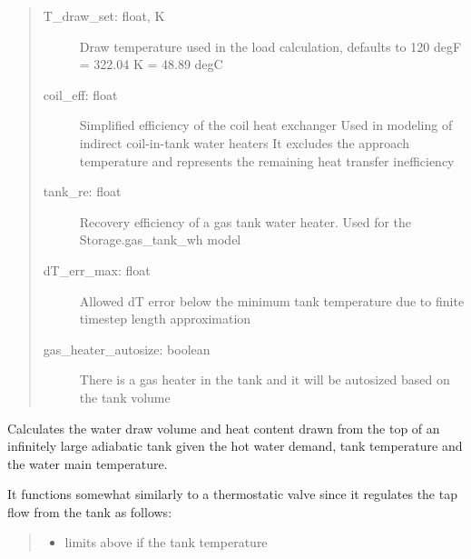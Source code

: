 \documentclass[letterpaper,10pt,english,openany]{sphinxmanual}
\begin{document}
\begin{fulllineitems}
\begin{fulllineitems}
\begin{quote}
\begin{description}
\item[{T\_draw\_set: float, K}] \leavevmode
Draw temperature used in the
load calculation, defaults to
120 degF = 322.04 K = 48.89 degC

\item[{coil\_eff: float}] \leavevmode
Simplified efficiency of the coil heat exchanger
Used in modeling of indirect coil-in-tank water heaters
It excludes the approach temperature and represents
the remaining heat transfer inefficiency

\item[{tank\_re: float}] \leavevmode
Recovery efficiency of a gas tank water heater.
Used for the Storage.gas\_tank\_wh model

\item[{dT\_err\_max: float}] \leavevmode
Allowed dT error below the minimum
tank temperature due to finite timestep length
approximation

\item[{gas\_heater\_autosize: boolean}] \leavevmode
There is a gas heater in the tank and it will be
autosized based on the tank volume

\end{description}
\end{quote}

\end{fulllineitems}


\begin{fulllineitems}
\label{\detokenize{source/mswh.system:mswh.system.components.Storage.size}}
\end{fulllineitems}


\begin{fulllineitems}
\label{\detokenize{source/mswh.system:mswh.system.components.Storage.tap}}
Calculates the water draw volume and
heat content drawn from the top of an infinitely
large adiabatic tank given the hot water demand,
tank temperature and the water main temperature.

It functions somewhat similarly to a
thermostatic valve since it regulates the
tap flow from the tank as follows:
\begin{quote}
\begin{itemize}
\item {} 
limits above if the tank temperature


\end{itemize}
\end{quote}
\end{fulllineitems}
\end{fulllineitems}
\end{document}
